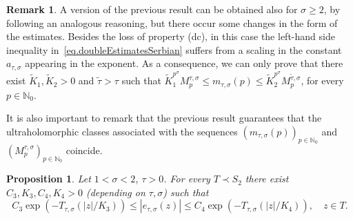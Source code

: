 \documentclass[12pt,leqno]{amsart}
\def\N{\mathbb{N}}
\theoremstyle{plain}
\newtheorem{prop}[theo]{Proposition}
\theoremstyle{definition}
\newtheorem{rem}[theo]{Remark}
\numberwithin{equation}{section}
\begin{document}
\begin{rem}\label{rem.ChangeBoundsSigmaGreater2}
A version of the previous result can be obtained also for $\sigma\ge 2$, by following an analogous reasoning, but there occur some changes in the form of the estimates. Besides the loss of property (dc), in this case the left-hand side inequality in~\eqref{eq.doubleEstimatesSerbian} suffers from a scaling in the constant $a_{\tau,\sigma}$ appearing in the exponent. As a consequence, we can only prove that there exist $\tilde{K}_1,\tilde{K}_2>0$ and $\tilde{\tau}>\tau$ such that $\tilde{K}_{1}^{p^{\sigma}}M_{p}^{\tau,\sigma}\le m_{\tau,\sigma}(p)\le \tilde{K}_{2}^{p^{\sigma}}M_p^{\tilde{\tau},\sigma}$, for every $p\in\N_0$.

It is also important to remark that the previous result guarantees that the ultraholomorphic  classes associated with the sequences $(m_{\tau,\sigma}(p))_{p\in\N_0}$ and $(M^{\tau,\sigma}_{p})_{p\in\N_0}$ coincide.
\end{rem}

\begin{prop}\label{prop.eOptimalFlatatInfinity}
Let $1<\sigma<2$, $\tau>0$. For every $T\prec S_{2}$ there exist $C_3,K_3,C_4,K_4>0$ (depending on $\tau,\sigma$) such that
\begin{equation*}%
C_3\exp(-T_{\tau,\sigma}(|z|/K_3))\le |e_{\tau,\sigma}(z)|\le C_4\exp(-T_{\tau,\sigma}(|z|/K_4)),\quad z\in T.
\end{equation*}
\end{prop}
\end{document}

